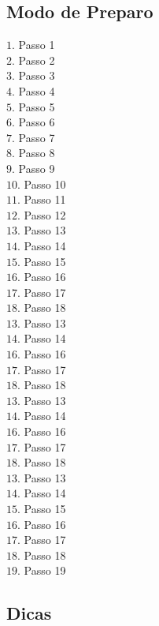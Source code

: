 \begin{aemulticol}[width=0.495\textwidth,height=0.545\textheight]
	\subsection*{\subsectionformat Modo de Preparo}
	\vspace*{-0.15cm}
	$1.$  Passo 1\\
	$2.$  Passo 2\\
	$3.$  Passo 3\\
	$4.$  Passo 4\\
	$5.$  Passo 5\\
	$6.$  Passo 6\\
	$7.$  Passo 7\\
	$8.$  Passo 8\\
	$9.$  Passo 9\\
	$10.$ Passo 10\\
	$11.$ Passo 11\\
	$12.$ Passo 12\\
	$13.$ Passo 13\\
	$14.$ Passo 14\\
	$15.$ Passo 15\\
	$16.$ Passo 16\\
	$17.$ Passo 17\\
	$18.$ Passo 18\\
	$13.$ Passo 13\\
	$14.$ Passo 14\\
	$16.$ Passo 16\\
	$17.$ Passo 17\\
	$18.$ Passo 18\\
	$13.$ Passo 13\\
	$14.$ Passo 14\\
	$16.$ Passo 16\\
	$17.$ Passo 17\\
	$18.$ Passo 18\\
	$13.$ Passo 13\\
	$14.$ Passo 14\\
	$15.$ Passo 15\\
	$16.$ Passo 16\\
	$17.$ Passo 17\\
	$18.$ Passo 18\\
	$19.$ Passo 19	

	\vspace*{-0.15cm}
	\subsection*{\subsectionformat Dicas}
	\vspace*{-0.15cm}
	

\end{aemulticol}
